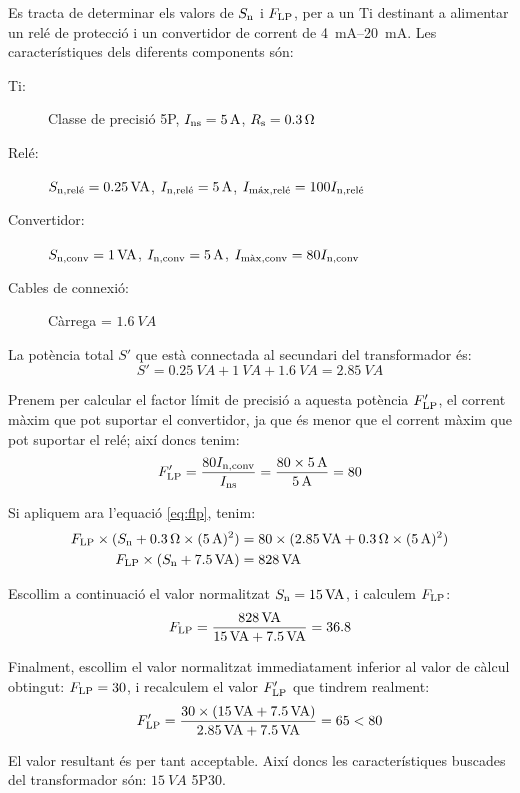 \begin{exemple}
    Es tracta de determinar els valors de $S_\mathrm{n}$ i $F_\mathrm{LP}$,  per
    a un Ti destinant a alimentar  un relé de protecció i un convertidor
    de corrent de \SIrange{4}{20}{mA}. Les característiques
    dels diferents components són:
    \begin{description}
        \item [\hspace{5mm}Ti:] Classe de precisió  5P, $I_\mathrm{ns}=\SI{5}{A}$,
        $R_\mathrm{s}=\SI{0,3}{\ohm}$
        \item [\hspace{5mm}Relé:] $S_\mathrm{n,rel\acute{e}}=\SI{0,25}{VA}$,
        $I_\mathrm{n,rel\acute{e}}=\SI{5}{A}$, $I_\mathrm{m\acute{a}x,rel\acute{e}}=
        100 I_\mathrm{n,rel\acute{e}}$
        \item [\hspace{5mm}Convertidor:] $S_\mathrm{n,conv}=\SI{1}{VA}$,
        $I_\mathrm{n,conv}=\SI{5}{A}$, $I_\mathrm{m\grave{a}x,conv}=
        80 I_\mathrm{n,conv}$
        \item [\hspace{5mm}Cables de connexió:] Càrrega = $\SI{1,6}{VA}$
    \end{description}

    La potència total $S'$ que està connectada al secundari del transformador
    és:
    \[
        S' = \SI{0,25}{VA} + \SI{1}{VA} + \SI{1,6}{VA} = \SI{2,85}{VA}
    \]

    Prenem per calcular el factor límit de precisió  a aquesta potència $F'_\mathrm{LP}$, el
    corrent màxim que pot suportar el convertidor, ja que és menor que el corrent màxim que pot suportar el relé; així doncs tenim:
    \[
        F'_\mathrm{LP} = \frac{80 I_\mathrm{n,conv}}{I_\mathrm{ns}} =
        \frac{80\times \SI{5}{A}}{\SI{5}{A}} = 80
    \]

    Si apliquem ara l'equació \eqref{eq:flp}, tenim:
    \begin{align*}
        F_\mathrm{LP}\times(S_\mathrm{n}+\SI{0,3}{\ohm} \times (\SI{5}{A})^2) &=
        80\times(\SI{2,85}{VA}+\SI{0,3}{\ohm} \times (\SI{5}{A})^2) \\
        F_\mathrm{LP}\times(S_\mathrm{n}+\SI{7,5}{VA}) &= \SI{828}{VA}
    \end{align*}

    Escollim a continuació el valor normalitzat $S_\mathrm{n}=
    \SI{15}{VA}$, i calculem $F_\mathrm{LP}$:
    \[
        F_\mathrm{LP} = \frac{\SI{828}{VA}}{\SI{15}{VA}+\SI{7,5}{VA}}
        = \num{36,8}
    \]

    Finalment, escollim el valor normalitzat immediatament inferior al valor
    de càlcul obtingut: $F_\mathrm{LP} = 30$, i
    recalculem el valor $F'_\mathrm{LP}$ que tindrem realment:
    \[
    F'_\mathrm{LP} = \frac{30\times(\SI{15}{VA} + \SI{7,5}{VA})}
    {\SI{2,85}{VA} + \SI{7,5}{VA}} = 65 < 80
    \]

    El valor resultant és per tant acceptable. Així doncs les
    característiques buscades del transformador són: $\SI{15}{VA}$ 5P30.
\end{exemple}


